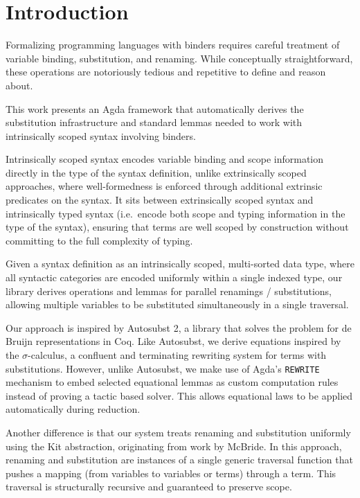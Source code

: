 \documentclass[screen,nonacm]{acmart}
\begin{document}
\maketitle

\section{Introduction}\label{sec:introduction}

Formalizing programming languages with binders requires careful treatment of
variable binding, substitution, and renaming. While conceptually
straightforward, these operations are notoriously tedious and repetitive to
define and reason about.

This work presents an Agda framework that automatically derives the
substitution infrastructure and standard lemmas needed to work with
intrinsically scoped syntax involving binders.

Intrinsically scoped syntax encodes variable binding and scope information
directly in the type of the syntax definition, unlike extrinsically scoped
approaches, where well-formedness is enforced through additional extrinsic
predicates on the syntax. It sits between extrinsically scoped syntax and
intrinsically typed syntax (i.e.\ encode both scope and typing information in
the type of the syntax), ensuring that terms are well scoped by construction
without committing to the full complexity of typing.

Given a syntax definition as an intrinsically scoped, multi-sorted data type,
where all syntactic categories are encoded uniformly within a single indexed
type, our library derives operations and lemmas for parallel renamings /
substitutions, allowing multiple variables to be substituted simultaneously in
a single traversal.

Our approach is inspired by Autosubst 2, a library that solves the problem for
de Bruijn representations in Coq. Like Autosubst, we derive equations inspired
by the \(\sigma\)-calculus, a confluent and terminating rewriting system for
terms with substitutions. However, unlike Autosubst, we make use of Agda’s
\texttt{REWRITE} mechanism to embed selected equational lemmas as custom
computation rules instead of proving a tactic based solver. This allows
equational laws to be applied automatically during reduction.

Another difference is that our system treats renaming and substitution
uniformly using the Kit abstraction, originating from work by McBride. In this
approach, renaming and substitution are instances of a single generic traversal
function that pushes a mapping (from variables to variables or terms) through a
term. This traversal is structurally recursive and guaranteed to preserve
scope.
\end{document}
